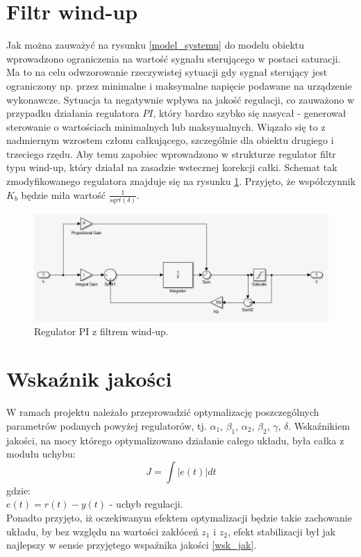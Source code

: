 \section{Filtr wind-up}
Jak można zauważyć na rysunku \ref{model_systemu} do modelu obiektu wprowadzono ograniczenia na wartość sygnału sterującego w postaci saturacji. Ma to na celu odwzorowanie rzeczywistej sytuacji gdy sygnał sterujący jest ograniczony np. przez minimalne i maksymalne napięcie podawane na urządzenie wykonawcze. Sytuacja ta negatywnie wpływa na jakość regulacji, co zauważono w przypadku działania regulatora $PI$, który bardzo szybko się nasycał - generował sterowanie o wartościach minimalnych lub maksymalnych. Wiązało się to z nadmiernym wzrostem członu całkującego, szczególnie dla obiektu drugiego i trzeciego rzędu. Aby temu zapobiec wprowadzono w strukturze regulator filtr typu wind-up, który działał na zasadzie wstecznej korekcji całki. Schemat tak zmodyfikowanego regulatora znajduje się na rysunku \ref{windUp}. Przyjęto, że współczynnik $K_b$ będzie miła wartość $\frac{1}{sqrt(\delta)}$.

\begin{figure}[h!]
	\centering
	\includegraphics[scale = 0.6]{fig/windUp.jpg}
	\caption		
	{Regulator PI z filtrem wind-up.}
	\label{windUp}
\end{figure} 

\section{Wska\'znik jakości}
W ramach projektu należało przeprowadzić optymalizację poszczególnych parametrów podanych powyżej regulatorów, tj. $\alpha_1$, $\beta_1$, $\alpha_2$, $\beta_2$, $\gamma$, $\delta$. Wskaźnikiem jakości, na mocy którego optymalizowano działanie całego układu, była całka z modułu uchybu:
\begin{equation}\label{wsk_jak}
J = \int |e(t)| dt
\end{equation}
gdzie: \\
$e(t) = r(t) - y(t)$ - uchyb regulacji.\\ 

 Ponadto przyjęto, iż oczekiwanym efektem optymalizacji będzie takie zachowanie układu, by bez względu na wartości zakłóceń $z_1$ i $z_2$, efekt stabilizacji był jak najlepszy w sensie przyjętego wspa\'znika jakości \ref{wsk_jak}.


